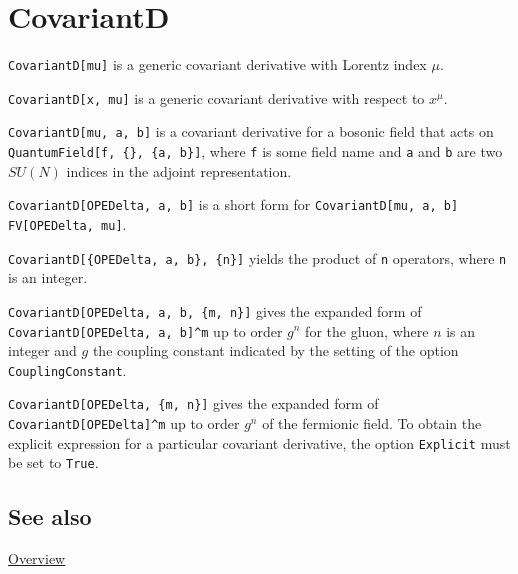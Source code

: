 \documentclass[../FeynCalcManual.tex]{subfiles}
\begin{document}
\hypertarget{covariantd}{
\section{CovariantD}\label{covariantd}}

\texttt{CovariantD[\allowbreak{}mu]} is a generic covariant derivative
with Lorentz index \(\mu\).

\texttt{CovariantD[\allowbreak{}x,\ \allowbreak{}mu]} is a generic
covariant derivative with respect to \(x^{\mu }\).

\texttt{CovariantD[\allowbreak{}mu,\ \allowbreak{}a,\ \allowbreak{}b]}
is a covariant derivative for a bosonic field that acts on
\texttt{QuantumField[\allowbreak{}f,\ \allowbreak{}\{\allowbreak{}\},\ \allowbreak{}\{\allowbreak{}a,\ \allowbreak{}b\}]},
where \texttt{f} is some field name and \texttt{a} and \texttt{b} are
two \(SU(N)\) indices in the adjoint representation.

\texttt{CovariantD[\allowbreak{}OPEDelta,\ \allowbreak{}a,\ \allowbreak{}b]}
is a short form for
\texttt{CovariantD[\allowbreak{}mu,\ \allowbreak{}a,\ \allowbreak{}b] FV[\allowbreak{}OPEDelta,\ \allowbreak{}mu]}.

\texttt{CovariantD[\allowbreak{}\{\allowbreak{}OPEDelta,\ \allowbreak{}a,\ \allowbreak{}b\},\ \allowbreak{}\{\allowbreak{}n\}]}
yields the product of \texttt{n} operators, where \texttt{n} is an
integer.

\texttt{CovariantD[\allowbreak{}OPEDelta,\ \allowbreak{}a,\ \allowbreak{}b,\ \allowbreak{}\{\allowbreak{}m,\ \allowbreak{}n\}]}
gives the expanded form of
\texttt{CovariantD[\allowbreak{}OPEDelta,\ \allowbreak{}a,\ \allowbreak{}b]^m}
up to order \(g^n\) for the gluon, where \(n\) is an integer and \(g\)
the coupling constant indicated by the setting of the option
\texttt{CouplingConstant}.

\texttt{CovariantD[\allowbreak{}OPEDelta,\ \allowbreak{}\{\allowbreak{}m,\ \allowbreak{}n\}]}
gives the expanded form of \texttt{CovariantD[\allowbreak{}OPEDelta]^m}
up to order \(g^n\) of the fermionic field. To obtain the explicit
expression for a particular covariant derivative, the option
\texttt{Explicit} must be set to \texttt{True}.

\subsection{See also}

\hyperlink{toc}{Overview}
\end{document}
